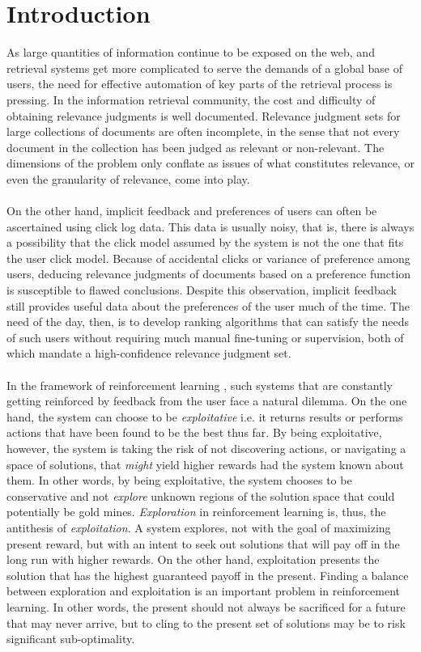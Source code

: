 \documentclass{acm_proc_article-sp}
\begin{document}
\section{Introduction}
As large quantities of information continue to be exposed on the web, and retrieval systems get more complicated to serve the demands of a global base of users, the need for effective automation of key parts of the retrieval process is pressing. In the information retrieval community, the cost and difficulty of obtaining relevance judgments is well documented. Relevance judgment sets for large collections of documents are often incomplete, in the sense that not every document in the collection has been judged as relevant or non-relevant. The dimensions of the problem only conflate as issues of what constitutes relevance, or even the granularity of relevance, come into play. \\ \\
On the other hand, implicit feedback and preferences of users can often be ascertained using click log data. This data is usually noisy, that is, there is always a possibility that the click model assumed by the system is not the one that fits the user click model. Because of accidental clicks or variance of preference among users, deducing relevance judgments of documents based on a preference function is susceptible to flawed conclusions. Despite this observation, implicit feedback still provides useful data about the preferences of the user much of the time. The need of the day, then, is to develop ranking algorithms that can satisfy the needs of such users without requiring much manual fine-tuning or supervision, both of which mandate a high-confidence relevance judgment set. \\ \\
In the framework of reinforcement learning \cite{rl}, such systems that are constantly getting reinforced by feedback from the user face a natural dilemma. On the one hand, the system can choose to be \emph{exploitative} i.e. it returns results or performs actions that have been found to be the best thus far. By being exploitative, however, the system is taking the risk of not discovering actions, or navigating a space of solutions, that \emph{might} yield higher rewards had the system known about them. In other words, by being exploitative, the system chooses to be conservative and not \emph{explore} unknown regions of the solution space that could potentially be gold mines. \emph{Exploration} in reinforcement learning is, thus, the antithesis of \emph{exploitation}. A system explores, not with the goal of maximizing present reward, but with an intent to seek out solutions that will pay off in the long run with higher rewards. On the other hand, exploitation presents the solution that has the highest guaranteed payoff in the present. Finding a balance between exploration and exploitation is an important problem in reinforcement learning. In other words, the present should not always be sacrificed for a future that may never arrive, but to cling to the present set of solutions may be to risk significant sub-optimality.\\ \\
\end{document}
